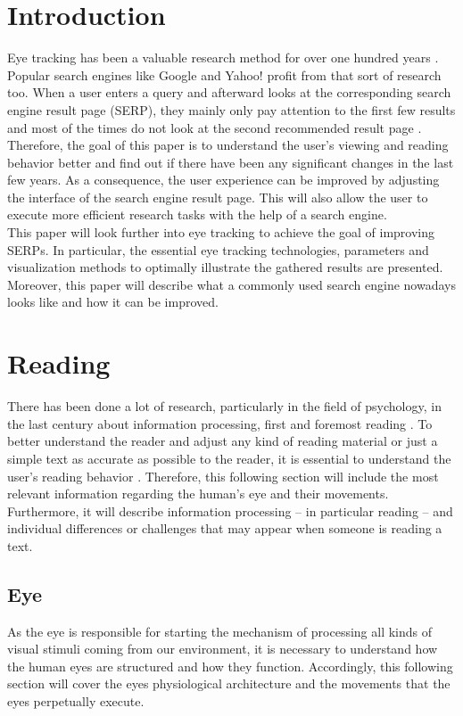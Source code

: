 \section{Introduction}
\label{section:Introduction}
Eye tracking has been a valuable research method for over one hundred years \autocite{biedert2010eyebook}. Popular search engines like Google and Yahoo! profit from that sort of research too. When a user enters a query and afterward looks at the corresponding search engine result page (SERP), they mainly only pay attention to the first few results and most of the times do not look at the second recommended result page \autocite{lorigo2008eye, liu2015influence}.\\
Therefore, the goal of this paper is to understand the user's viewing and reading behavior better and find out if there have been any significant changes in the last few years. As a consequence, the user experience can be improved by adjusting the interface of the search engine result page. This will also allow the user to execute more efficient research tasks with the help of a search engine.\\
This paper will look further into eye tracking to achieve the goal of improving SERPs. In particular, the essential eye tracking technologies, parameters and visualization methods to optimally illustrate the gathered results are presented. Moreover, this paper will describe what a commonly used search engine nowadays looks like and how it can be improved.


\section{Reading}
\label{section:Reading}
There has been done a lot of research, particularly in the field of psychology, in the last century about information processing, first and foremost reading \autocite{rayner1998eye, biedert2010eyebook}. 
To better understand the reader and adjust any kind of reading material or just a simple text as accurate as possible to the reader, it is essential to understand the user's reading behavior \autocite{biedert2010eyebook}. 
Therefore, this following section will include the most relevant information regarding the human's eye and their movements. Furthermore, it will describe information processing -- in particular reading -- and individual differences or challenges that may appear when someone is reading a text.

\subsection{Eye}
\label{subsection:Eye}
As the eye is responsible for starting the mechanism of processing all kinds of visual stimuli coming from our environment, it is necessary to understand how the human eyes are structured and how they function. Accordingly, this following section will cover the eyes physiological architecture and the movements that the eyes perpetually execute.

